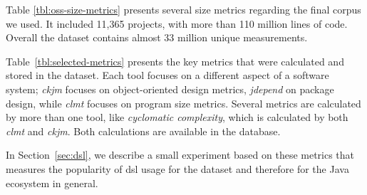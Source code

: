 \documentclass{sig-alternate}
\begin{document}
Table \ref{tbl:oss-size-metrics} presents several size metrics regarding the final corpus we used. It included 11,365 projects, with more than 110 million lines of code. Overall the dataset contains almost 33 million unique measurements.

Table~\ref{tbl:selected-metrics} presents the key metrics that were calculated and stored in the dataset. Each tool focuses on a different aspect of a software system; \textit{ckjm} focuses on object-oriented design metrics, \textit{jdepend} on package design, while \textit{clmt} focuses on program size metrics. Several metrics are calculated by more than one tool, like \textit{cyclomatic complexity}, which is calculated by both \textit{clmt} and \textit{ckjm}. Both calculations are available in the database.


In Section~\ref{sec:dsl}, we describe a small experiment based on these metrics that measures the popularity of {\sc dsl} usage for the dataset and therefore for the Java ecosystem in general.
\end{document}
